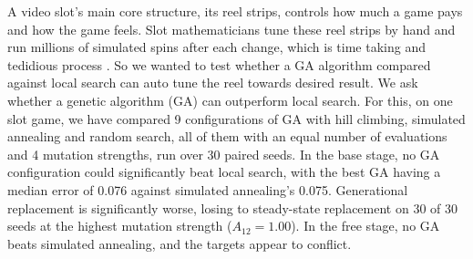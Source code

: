 A video slot's main core structure, its reel strips, controls how much a game pays and how the game feels. Slot mathematicians tune these reel strips by hand and run millions of simulated spins after each change, which is time taking and tedidious process . So we wanted to test whether a GA algorithm compared against local search can auto tune the reel towards desired result. We ask whether a genetic algorithm (GA) can outperform local search. For this, on one slot game, we have compared 9 configurations of GA with hill climbing, simulated annealing and random search, all of them with an equal number of evaluations and 4 mutation strengths, run over 30 paired seeds. In the base stage, no GA configuration could significantly beat local search, with the best GA having a median error of 0.076 against simulated annealing's 0.075. Generational replacement is significantly worse, losing to steady-state replacement on 30 of 30 seeds at the highest mutation strength ($A_{12} = 1.00$). In the free stage, no GA beats simulated annealing, and the targets appear to conflict.
